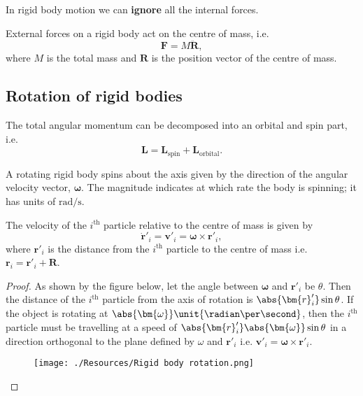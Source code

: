 \documentclass[12pt, a4paper]{article}
\begin{document}
\begin{mdremark}
    In rigid body motion we can \textbf{ignore} all the internal forces.
\end{mdremark}

\begin{theorem}
    External forces on a rigid body act on the centre of mass, i.e.
    \[\bm{F}=M\ddot{\bm{R}},\]
    where \(M\) is the total mass and \(\bm{R}\) is the position vector of the centre of mass.
\end{theorem}

\subsection{Rotation of rigid bodies}

\begin{theorem}
    The total angular momentum can be decomposed into an orbital and spin part, i.e.
    \[\bm{L}=\bm{L}_{\text{spin}}+\bm{L}_{\text{orbital}}.\]
\end{theorem}

\begin{theorem}
    A rotating rigid body spins about the axis given by the direction of the angular velocity vector, \(\bm{\omega}\).
    The magnitude indicates at which rate the body is spinning; it has units of \(\unit{\radian\per\second}\).
\end{theorem}

\begin{mdthm}
    The velocity of the \(i^{\text{th}}\) particle relative to the centre of mass is given by 
    \[\bm{\dot{r}}'_i=\bm{v}'_i = \bm{\omega} \times \bm{r}'_i,\]
    where \(\bm{r}'_i\) is the distance from the \(i^{\text{th}}\) particle to the centre of mass i.e. \(\bm{r}_i = \bm{r}'_i+\bm{R}\).
\end{mdthm}

\begin{proof}
    As shown by the figure below, let the angle between \(\bm{\omega}\) and \(\bm{r}'_i\) be \(\theta\). Then the distance of the \(i^{\text{th}}\) particle from the axis of rotation is \(\abs{\bm{r}'_i}\sin\theta\). If the object is rotating at \(\abs{\bm{\omega}} \unit{\radian\per\second}\), then the \(i^{\text{th}}\) particle must be travelling at a speed of \(\abs{\bm{r}'_i}\abs{\bm{\omega}}\sin\theta\) in a direction orthogonal to the plane defined by \(\omega\) and \(\bm{r}'_i\) i.e. \(\bm{v}'_i=\bm{\omega} \times \bm{r}'_i\).
    \begin{figure}[H]
        \begin{center}
            \texttt{[image: ./Resources/Rigid body rotation.png]}
        \end{center}
    \end{figure}
\end{proof}
\end{document}
